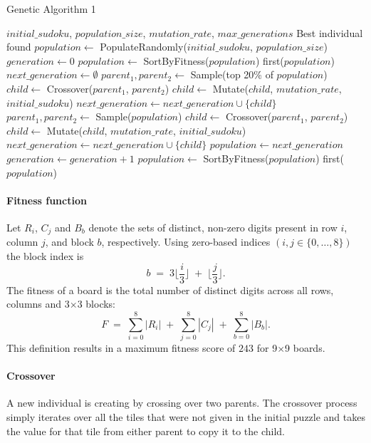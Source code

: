 \begin{algorithm}[H]
\caption{Genetic Algorithm 1}\label{alg:impl-1}
\begin{algorithmic}
\Require $initial\_sudoku$, $population\_size$, $mutation\_rate$, $max\_generations$
\Ensure Best individual found
\State $population \gets$ PopulateRandomly($initial\_sudoku$, $population\_size$)
\State $generation \gets 0$
  \State $population \gets$ SortByFitness($population$) 
    \State \Return first($population$)
  \EndIf
  \State $next\_generation \gets \emptyset$
    \State $parent_1, parent_2 \gets$ Sample(top 20\% of $population$)
    \State $child \gets$ Crossover($parent_1$, $parent_2$)
    \State $child \gets$ Mutate($child$, $mutation\_rate$, $initial\_sudoku$)
    \State $next\_generation \gets next\_generation \cup \{child\}$
  \EndFor
    \State $parent_1, parent_2 \gets$ Sample($population$)
    \State $child \gets$ Crossover($parent_1$, $parent_2$)
    \State $child \gets$ Mutate($child$, $mutation\_rate$, $initial\_sudoku$)
    \State $next\_generation \gets next\_generation \cup \{child\}$
  \EndFor
  \State $population \gets next\_generation$
  \State $generation \gets generation + 1$
\EndWhile
\State $population \gets$ SortByFitness($population$) 
\State \Return first($population$)
\end{algorithmic}
\end{algorithm}


\paragraph{Fitness function}\label{par:ff-impl1} Let $R_i$, $C_j$ and $B_b$ denote the sets of distinct, non-zero digits present in row $i$, column $j$, and block $b$, respectively. Using zero-based indices $(i,j\in\{0,\dots,8\})$ the block index is
\[
b \;=\; 3\Big\lfloor\frac{i}{3}\Big\rfloor \;+\; \Big\lfloor\frac{j}{3}\Big\rfloor .
\]
The fitness of a board is the total number of distinct digits across all rows, columns and 3\(\times\)3 blocks:
\[
F \;=\; \sum_{i=0}^{8} |R_i| \;+\; \sum_{j=0}^{8} |C_j| \;+\; \sum_{b=0}^{8} |B_b|.
\]
This definition results in a maximum fitness score of $243$ for 9$\times$9 boards.

\paragraph{Crossover} A new individual is creating by crossing over two parents. The crossover process simply iterates over all the tiles that were not given in the initial puzzle and takes the value for that tile from either parent to copy it to the child.

